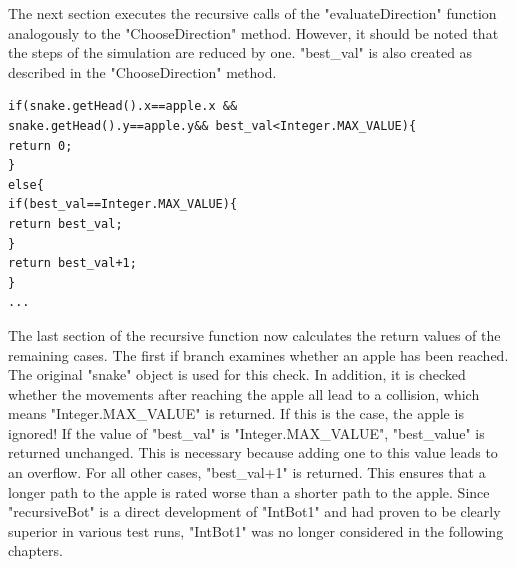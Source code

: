\documentclass[a4paper,12pt]{article}
\begin{document}
The next section executes the recursive calls of the "evaluateDirection" function analogously to the
"ChooseDirection" method. However, it should be noted that the steps of the simulation are reduced by one. "best\_val" is also created as described in the "ChooseDirection" method.
\begin{verbatim}
if(snake.getHead().x==apple.x &&
snake.getHead().y==apple.y&& best_val<Integer.MAX_VALUE){
return 0;
}
else{
if(best_val==Integer.MAX_VALUE){
return best_val;
}
return best_val+1;
}
...
\end{verbatim}
The last section of the recursive function now calculates the return values of the remaining cases.
The first if branch examines whether an apple has been reached. The original "snake" object is used
for this check. In addition, it is checked whether the movements after reaching the apple all lead to a
collision, which means "Integer.MAX\_VALUE" is returned. If this is the case, the apple is ignored!
If the value of "best\_val" is "Integer.MAX\_VALUE", "best\_value" is returned unchanged. This is
necessary because adding one to this value leads to an overflow.
For all other cases, "best\_val+1" is returned. This ensures that a longer path to the apple is rated
worse than a shorter path to the apple. Since "recursiveBot" is a direct development of "IntBot1" and had proven to be clearly superior in
various test runs, "IntBot1" was no longer considered in the following chapters.
\end{document}
